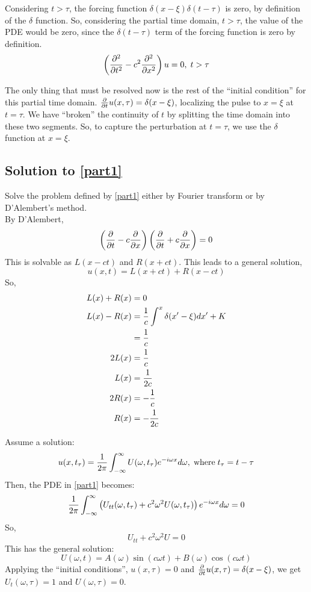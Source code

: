 \documentclass[12pt]{article}
\begin{document}
Considering $t > \tau$, the forcing function $\delta(x - \xi)\delta(t - \tau)$ is zero, by definition of the $\delta$ function. So, considering the partial time domain, $t > \tau$, the value of the PDE would be zero, since the $\delta(t - \tau)$ term of the forcing function is zero by definition.
\[ \left (\frac{\partial^2}{\partial t^2} - c^2\frac{\partial^2}{\partial x^2}\right ) u = 0, \;t > \tau \]

The only thing that must be resolved now is the rest of the ``initial condition'' for this partial time domain. $\frac{\partial}{\partial t}u(x,\tau) = \delta(x - \xi)$, localizing the pulse to $x = \xi$ at $t = \tau$. We have ``broken'' the continuity of $t$ by splitting the time domain into these two segments. So, to capture the perturbation at $t = \tau$, we use the $\delta$ function at $x = \xi$.

\subsection{Solution to \ref{part1}}
\label{part2}

Solve the problem defined by \ref{part1} either  by Fourier transform or by D'Alembert's method.
\[ \]
By D'Alembert, 
\[ \left (\frac{\partial}{\partial t} - c\frac{\partial}{\partial x}\right )\left (\frac{\partial}{\partial t} + c\frac{\partial}{\partial x}\right ) = 0 \] 
This is solvable as $L(x - ct)$ and $R(x + ct)$.
This leads to a general solution, 
\[ u(x,t) = L(x + ct) + R(x - ct) \]
So, 
\begin{align*}
L(x) + R(x) &= 0 \\
L(x) - R(x) &= \frac{1}{c}\int^x \delta(x^{\prime}-\xi)dx^{\prime} + K \\
&= \frac{1}{c} \\
2L(x) &= \frac{1}{c} \\
L(x) &= \frac{1}{2c} \\
2R(x) &= -\frac{1}{c} \\
R(x) &= -\frac{1}{2c}
\end{align*}

Assume a solution:
\[ u(x,t_\tau) = \frac{1}{2\pi}\int_{-\infty}^\infty U(\omega,t_\tau)e^{-i\omega x}d\omega, \; \mathrm{where} \; t_\tau = t - \tau \]
Then, the PDE in \ref{part1} becomes:
\[ \frac{1}{2\pi}\int_{-\infty}^\infty\left ( U_{tt}(\omega,t_\tau) + c^2\omega^2U(\omega,t_\tau)\right ) e^{-i\omega x}d\omega = 0 \]
So, 
\[U_{tt} + c^2\omega^2 U = 0 \]
This has the general solution:
\[ U(\omega,t) = A(\omega)\sin(c\omega t) + B(\omega)\cos(c\omega t) \]
Applying the ``initial conditions'', $u(x,\tau) = 0$ and $\frac{\partial}{\partial t}u(x,\tau) = \delta(x-\xi)$, we get $U_t(\omega,\tau) = 1$ and $U(\omega,\tau) = 0$.
\end{document}

